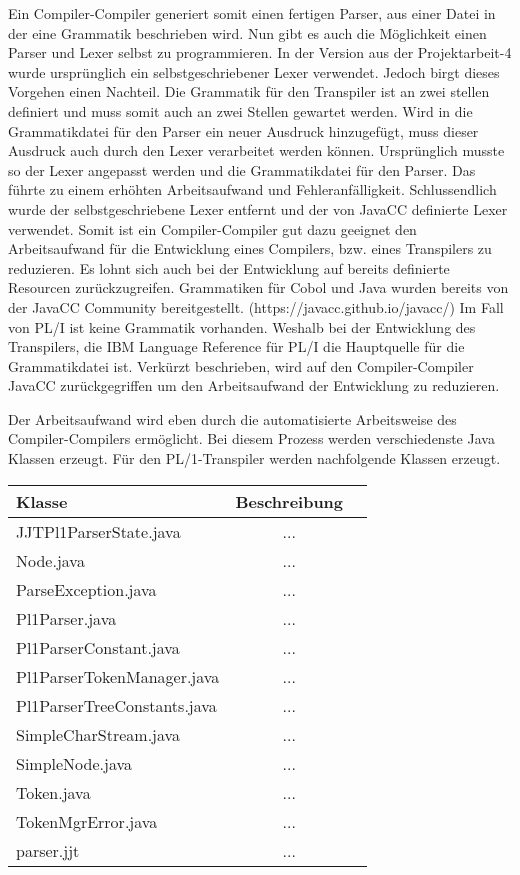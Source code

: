Ein Compiler-Compiler generiert somit einen fertigen Parser, aus einer Datei in der eine Grammatik beschrieben wird. Nun gibt es auch die Möglichkeit einen Parser und Lexer selbst zu programmieren. In der Version aus der Projektarbeit-4 wurde ursprünglich ein selbstgeschriebener Lexer verwendet.
Jedoch birgt dieses Vorgehen einen Nachteil. Die Grammatik für den Transpiler ist an zwei stellen definiert und muss somit auch an zwei Stellen gewartet werden.
Wird in die Grammatikdatei für den Parser ein neuer Ausdruck hinzugefügt, muss dieser Ausdruck auch durch den Lexer verarbeitet werden können.
Ursprünglich musste so der Lexer angepasst werden und die Grammatikdatei für den Parser. 
Das führte zu einem erhöhten Arbeitsaufwand und Fehleranfälligkeit. Schlussendlich wurde der selbstgeschriebene Lexer entfernt und der von JavaCC definierte Lexer verwendet.
Somit ist ein Compiler-Compiler gut dazu geeignet den Arbeitsaufwand für die Entwicklung eines Compilers, bzw. eines Transpilers zu reduzieren. 
Es lohnt sich auch bei der Entwicklung auf bereits definierte Resourcen zurückzugreifen. 
Grammatiken für Cobol und Java wurden bereits von der JavaCC Community bereitgestellt. (https://javacc.github.io/javacc/)
Im Fall von PL/I ist keine Grammatik vorhanden. Weshalb bei der Entwicklung des Transpilers, die IBM Language Reference für PL/I die Hauptquelle für die Grammatikdatei ist.  
Verkürzt beschrieben, wird auf den Compiler-Compiler JavaCC zurückgegriffen um den Arbeitsaufwand der Entwicklung zu reduzieren. 

Der Arbeitsaufwand wird eben durch die automatisierte Arbeitsweise des Compiler-Compilers ermöglicht. Bei diesem Prozess werden verschiedenste Java Klassen erzeugt. Für den PL/1-Transpiler werden nachfolgende Klassen erzeugt.

\begin{tabular}[h]{l|c|r}
Klasse & Beschreibung \\
\hline
JJTPl1ParserState.java & ... \\
Node.java & ... \\
ParseException.java & ... \\
Pl1Parser.java & ... \\
Pl1ParserConstant.java & ... \\
Pl1ParserTokenManager.java & ... \\
Pl1ParserTreeConstants.java & ... \\
SimpleCharStream.java & ... \\
SimpleNode.java & ... \\
Token.java & ... \\
TokenMgrError.java & ... \\
parser.jjt & ... \\
\end{tabular}



